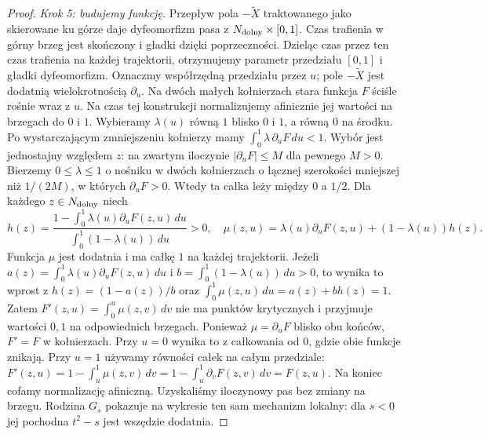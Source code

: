 \begin{proof}
\emph{Krok 5: budujemy funkcję.}
Przepływ pola $-\widetilde X$
traktowanego jako skierowane ku
górze daje dyfeomorfizm pasa
z $N_{\rm dolny}\times[0,1]$.
Czas trafienia w górny brzeg jest skończony
i gładki dzięki poprzeczności. Dzieląc czas przez
ten czas trafienia na każdej trajektorii, otrzymujemy
parametr przedziału $[0,1]$ i gładki dyfeomorfizm.
Oznaczmy współrzędną przedziału przez $u$; pole $-\widetilde X$
jest dodatnią wielokrotnością
$\partial_u$. Na dwóch małych
kołnierzach stara funkcja $F$
ściśle rośnie wraz z $u$.
Na czas tej konstrukcji normalizujemy
afinicznie jej wartości na brzegach
do $0$ i $1$.
Wybieramy $\lambda(u)$ równą $1$
blisko $0$ i $1$, a równą $0$
na środku. Po wystarczającym
zmniejszeniu kołnierzy mamy
$\int_0^1\lambda\,\partial_uF\,du<1$.
Wybór jest jednostajny względem $z$: na zwartym iloczynie
$|\partial_uF|\leq M$ dla pewnego $M>0$. Bierzemy
$0\leq\lambda\leq1$ o nośniku w dwóch kołnierzach
o łącznej szerokości mniejszej niż $1/(2M)$, w których
$\partial_uF>0$. Wtedy ta całka leży między $0$ a $1/2$.
Dla każdego $z\in N_{\rm dolny}$ niech
\[
 h(z)=
 \frac{1-\int_0^1\lambda(u)
                 \partial_uF(z,u)\,du}
      {\int_0^1(1-\lambda(u))\,du}>0,
 \quad
 \mu(z,u)=\lambda(u)\partial_uF(z,u)
            +(1-\lambda(u))h(z).
\]
Funkcja $\mu$ jest dodatnia i ma
całkę $1$ na każdej trajektorii.
Jeżeli $a(z)=\int_0^1\lambda(u)\partial_uF(z,u)\,du$
i $b=\int_0^1(1-\lambda(u))\,du>0$, to wynika to wprost
z $h(z)=(1-a(z))/b$ oraz
$\int_0^1\mu(z,u)\,du=a(z)+b h(z)=1$.
Zatem $F'(z,u)=\int_0^u\mu(z,v)\,dv$
nie ma punktów krytycznych i przyjmuje
wartości $0,1$ na odpowiednich brzegach.
Ponieważ $\mu=\partial_uF$ blisko
obu końców, $F'=F$ w kołnierzach.
Przy $u=0$ wynika to z całkowania od $0$, gdzie obie funkcje
znikają. Przy $u=1$ używamy równości całek na całym przedziale:
$F'(z,u)=1-\int_u^1\mu(z,v)\,dv
=1-\int_u^1\partial_vF(z,v)\,dv=F(z,u)$.
Na koniec cofamy normalizację afiniczną.
Uzyskaliśmy iloczynowy pas bez
zmiany na brzegu. Rodzina $G_s$
pokazuje na wykresie ten sam
mechanizm lokalny: dla $s<0$
jej pochodna $t^2-s$ jest
wszędzie dodatnia.
\end{proof}

